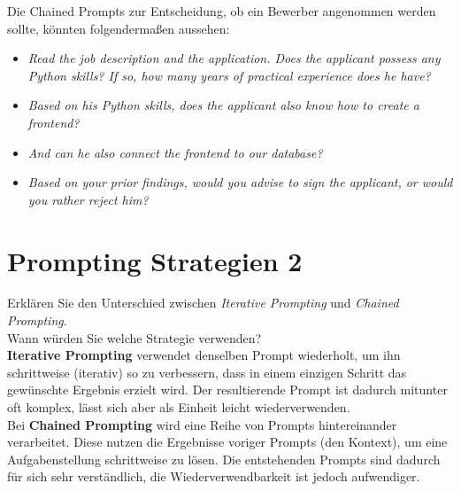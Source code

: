 \documentclass[12pt,ngerman]{AssignmentClass}
\begin{document}
\begin{enumerate}[a)]
            Die Chained Prompts zur Entscheidung, ob ein Bewerber angenommen werden sollte, könnten folgendermaßen aussehen:
            \begin{itemize}
                \item \textit{Read the job description and the application. Does the applicant possess any Python skills? If so, how many years of practical experience does he have?}
                \item \textit{Based on his Python skills, does the applicant also know how to create a frontend?}
                \item \textit{And can he also connect the frontend to our database?}
                \item \textit{Based on your prior findings, would you advise to sign the applicant, or would you rather reject him?}
            \end{itemize}	
            
        \end{enumerate}


    
    \section{Prompting Strategien 2}
        Erklären Sie den Unterschied zwischen \textit{Iterative Prompting} und \textit{Chained Prompting}.\\
        Wann würden Sie welche Strategie verwenden?\\

        \textbf{Iterative Prompting} verwendet denselben Prompt wiederholt, um ihn schrittweise (iterativ) so zu verbessern, dass in einem einzigen Schritt das gewünschte Ergebnis erzielt wird. Der resultierende Prompt ist dadurch mitunter oft komplex, lässt sich aber als Einheit leicht wiederverwenden.\\
        
        Bei \textbf{Chained Prompting} wird eine Reihe von Prompts hintereinander verarbeitet. Diese nutzen die Ergebnisse voriger Prompts (den Kontext), um eine Aufgabenstellung schrittweise zu lösen. Die entstehenden Prompts sind dadurch für sich sehr verständlich, die Wiederverwendbarkeit ist jedoch aufwendiger.

    
\end{document}
